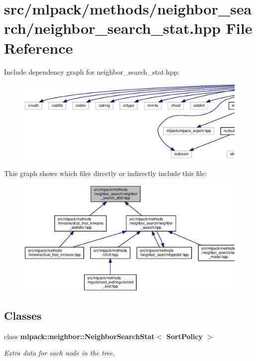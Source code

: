 \section{src/mlpack/methods/neighbor\+\_\+search/neighbor\+\_\+search\+\_\+stat.hpp File Reference}
\label{neighbor__search__stat_8hpp}
Include dependency graph for neighbor\+\_\+search\+\_\+stat.\+hpp\+:
\nopagebreak
\begin{figure}[H]
\begin{center}
\leavevmode
\includegraphics[width=350pt]{neighbor__search__stat_8hpp__incl}
\end{center}
\end{figure}
This graph shows which files directly or indirectly include this file\+:
\nopagebreak
\begin{figure}[H]
\begin{center}
\leavevmode
\includegraphics[width=350pt]{neighbor__search__stat_8hpp__dep__incl}
\end{center}
\end{figure}
\subsection*{Classes}
\begin{DoxyCompactItemize}
\item 
class {\bf mlpack\+::neighbor\+::\+Neighbor\+Search\+Stat$<$ Sort\+Policy $>$}
\begin{DoxyCompactList}\small\item\em Extra data for each node in the tree. \end{DoxyCompactList}\end{DoxyCompactItemize}
